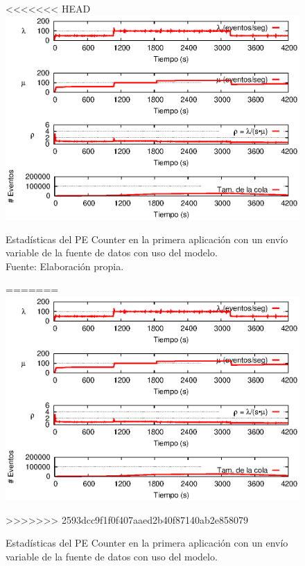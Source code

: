 \begin{figure}[!ht]
<<<<<<< HEAD
    \centering
    \captionsetup{justification=centering}
    \includegraphics[scale=1]{images/exp/app1/normal/cm/statusCounterPE.eps}
    \caption[Estadísticas del PE Counter en la primera aplicación con un envío variable de la fuente de datos con uso del modelo.]{Estadísticas del PE Counter en la primera aplicación con un envío variable de la fuente de datos con uso del modelo.\\Fuente: Elaboración propia.}
=======
\centering
    \includegraphics[scale=1.1]{images/exp/app1/normal/cm/statusCounterPE.eps}
    \caption{Estad\'isticas del PE Counter en la primera aplicaci\'on con un env\'io variable de la fuente de datos con uso del modelo.}
>>>>>>> 2593dcc9f1f0f407aaed2b40f87140ab2e858079
    \label{fig:app1-normal-statusCounterPE-cm}
\end{figure}

